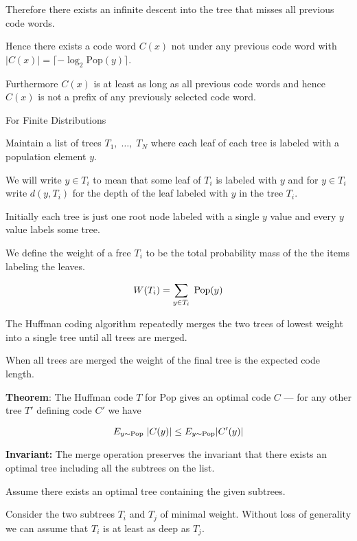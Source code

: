 \vfill
Therefore there exists an infinite descent into the tree that misses all previous code words.

\vfill
Hence there exists a code word $C(x)$ not under any previous code word with
$|C(x)| = \lceil - \log_2 \mathrm{Pop}(y)\rceil$.

\vfill
Furthermore $C(x)$ is at least as long as all previous code words and hence $C(x)$ is not a prefix of any previously selected code word.

{For Finite Distributions}

Maintain a list of trees $T_1,\;\dots,\;T_N$ where each leaf of each tree is labeled with a population element $y$.

\vfill
We will write $y \in T_i$ to mean that some leaf of $T_i$ is labeled with $y$ and for $y \in T_i$ write $d(y,T_i)$ for the depth
of the leaf labeled with $y$ in the tree $T_i$.

\vfill
Initially each tree is just one root node labeled with a single $y$ value and every $y$ value labels some tree.


\vfill
We define the weight of a free $T_i$ to be the total probability mass of the the items labeling the leaves.

$$W(T_i) = \sum_{y \in T_i}\;\mathrm{Pop}(y)$$

\vfill
The Huffman coding algorithm repeatedly merges the two trees of lowest weight into a single tree until all trees are merged.

\vfill
When all trees are merged the weight of the final tree is the expected code length.


{\bf Theorem}: The Huffman code $T$ for $\mathrm{Pop}$ gives an optimal code $C$ --- for any other tree $T'$ defining code $C'$ we have

$$E_{y \sim \mathrm{Pop}}\;|C(y)| \leq E_{y \sim \mathrm{Pop}} |C'(y)|$$

\vfill
{\bf Invariant:} The merge operation preserves the invariant that there exists an optimal tree including
all the subtrees on the list.


Assume there exists an optimal tree containing the given subtrees.

\vfill
Consider the two subtrees $T_i$ and $T_j$ of minimal weight.  Without loss of generality we can assume that $T_i$ is at least as deep as $T_j$.

